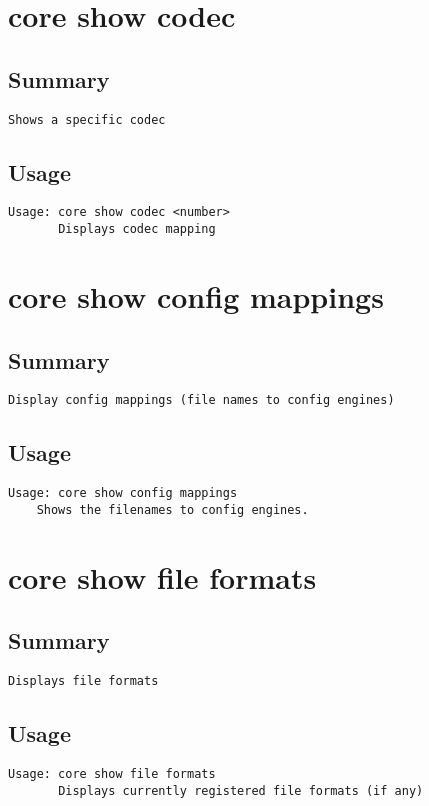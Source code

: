 \section{core show codec}
\subsection{Summary}
\begin{verbatim}
Shows a specific codec
\end{verbatim}
\subsection{Usage}
\begin{verbatim}
Usage: core show codec <number>
       Displays codec mapping

\end{verbatim}


\section{core show config mappings}
\subsection{Summary}
\begin{verbatim}
Display config mappings (file names to config engines)
\end{verbatim}
\subsection{Usage}
\begin{verbatim}
Usage: core show config mappings
	Shows the filenames to config engines.

\end{verbatim}


\section{core show file formats}
\subsection{Summary}
\begin{verbatim}
Displays file formats
\end{verbatim}
\subsection{Usage}
\begin{verbatim}
Usage: core show file formats
       Displays currently registered file formats (if any)

\end{verbatim}


